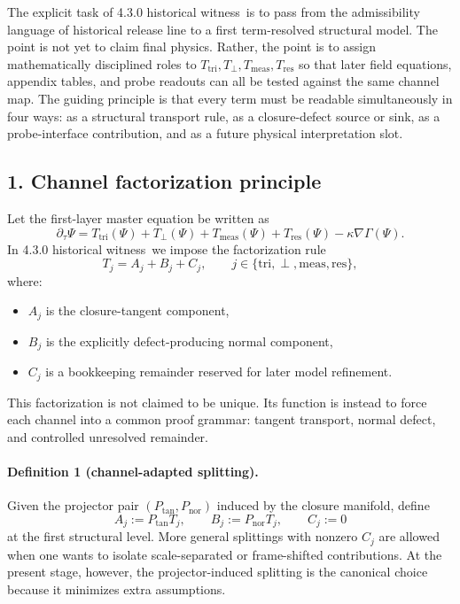 \documentclass[12pt,a4paper]{article}
\DeclareRobustCommand{\QSCver}[1]{archival stage}
\newcommand{\docversion}{4.3.0 historical witness}
\renewcommand{\QSCver}[1]{historical release line}
\begin{document}
The explicit task of \docversion\ is to pass from the admissibility language of
\QSCver{v2.3.0} to a first term-resolved structural model. The point is not yet to claim
final physics. Rather, the point is to assign mathematically disciplined roles to
\(T_{\mathrm{tri}},T_{\perp},T_{\mathrm{meas}},T_{\mathrm{res}}\) so that later field equations,
appendix tables, and probe readouts can all be tested against the same channel map.
The guiding principle is that every term must be readable simultaneously in four
ways: as a structural transport rule, as a closure-defect source or sink, as a
probe-interface contribution, and as a future physical interpretation slot.

\subsection*{1. Channel factorization principle}
Let the first-layer master equation be written as
\[
\partial_\tau \Psi
= T_{\mathrm{tri}}(\Psi)
+ T_{\perp}(\Psi)
+ T_{\mathrm{meas}}(\Psi)
+ T_{\mathrm{res}}(\Psi)
- \kappa \nabla\Gamma(\Psi).
\]
In \docversion\ we impose the factorization rule
\[
T_j = A_j + B_j + C_j,
\qquad j\in\{\mathrm{tri},\perp,\mathrm{meas},\mathrm{res}\},
\]
where:
\begin{itemize}
 \item $A_j$ is the closure-tangent component,
 \item $B_j$ is the explicitly defect-producing normal component,
 \item $C_j$ is a bookkeeping remainder reserved for later model refinement.
\end{itemize}
This factorization is not claimed to be unique. Its function is instead to force
each channel into a common proof grammar: tangent transport, normal defect, and
controlled unresolved remainder.

\paragraph{Definition 1 (channel-adapted splitting).}
Given the projector pair $(P_{\mathrm{tan}},P_{\mathrm{nor}})$ induced by the closure
manifold, define
\[
A_j:=P_{\mathrm{tan}}T_j,
\qquad
B_j:=P_{\mathrm{nor}}T_j,
\qquad
C_j:=0
\]
at the first structural level. More general splittings with nonzero $C_j$ are
allowed when one wants to isolate scale-separated or frame-shifted contributions.
At the present stage, however, the projector-induced splitting is the canonical
choice because it minimizes extra assumptions.
\end{document}
